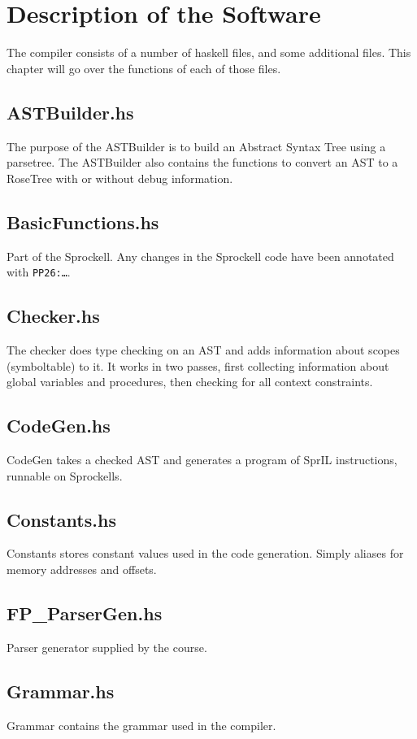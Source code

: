 \documentclass[twoside]{report}
\begin{document}
\chapter{Description of the Software}
\label{description_of_the_software}
The compiler consists of a number of haskell files, and some additional files. This chapter will go over the functions of each of those files.

\section{ASTBuilder.hs}
The purpose of the ASTBuilder is to build an Abstract Syntax Tree using a parsetree. The ASTBuilder also contains the functions to convert an AST to a RoseTree with or without debug information.

\section{BasicFunctions.hs}
Part of the Sprockell. Any changes in the Sprockell code have been annotated with \texttt{PP26:\ldots}.

\section{Checker.hs}
The checker does type checking on an AST and adds information about scopes (symboltable) to it. It works in two passes, first collecting information about global variables and procedures, then checking for all context constraints.

\section{CodeGen.hs}
CodeGen takes a checked AST and generates a program of SprIL instructions, runnable on Sprockells.

\section{Constants.hs}
Constants stores constant values used in the code generation. Simply aliases for memory addresses and offsets.

\section{FP\_{}ParserGen.hs}
Parser generator supplied by the course.

\section{Grammar.hs}
Grammar contains the grammar used in the compiler.
\end{document}
